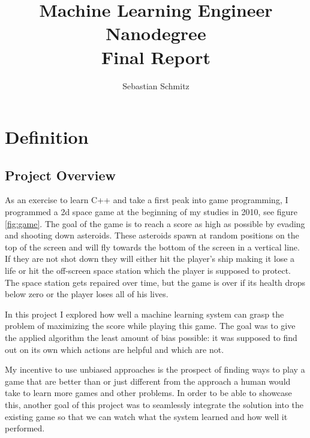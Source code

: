 \documentclass[a4paper,10pt]{article}
\title{Machine Learning Engineer Nanodegree\\Final Report}
\author{Sebastian Schmitz}
\begin{document}
\maketitle
\clearpage
\section{Definition}

\subsection{Project Overview}
As an exercise to learn C++ and take a first peak into game programming, I programmed a 2d space game at the beginning of my studies in 2010, see figure \ref{fig:game}.
The goal of the game is to reach a score as high as possible by evading and shooting down asteroids.
These asteroids spawn at random positions on the top of the screen and will fly towards the bottom of the screen in a vertical line.
If they are not shot down they will either hit the player's ship making it lose a life or hit the off-screen space station which the player is supposed to protect.
The space station gets repaired over time, but the game is over if its health drops below zero or the player loses all of his lives.

In this project I explored how well a machine learning system can grasp the problem of maximizing the score while playing this game.
The goal was to give the applied algorithm the least amount of bias possible: it was supposed to find out on its own which actions are helpful and which are not.

My incentive to use unbiased approaches is the prospect of finding ways to play a game that are better than or just different from the approach a human would take to learn more games and other problems.
In order to be able to showcase this, another goal of this project was to seamlessly integrate the solution into the existing game so that we can watch what the system learned and how well it performed.

\end{document}

